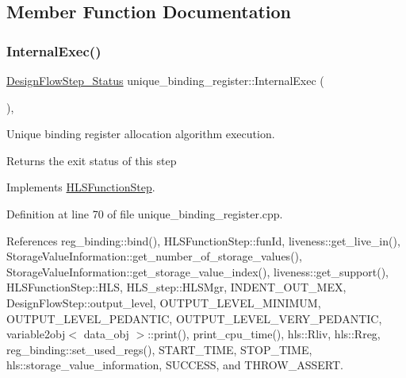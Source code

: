 \subsection{Member Function Documentation}
\mbox{\label{classunique__binding__register_a2ac66d0bc11cd4e54db2042014b52291}} 
\subsubsection{\texorpdfstring{Internal\+Exec()}{InternalExec()}}
{\footnotesize\ttfamily \hyperlink{design__flow__step_8hpp_afb1f0d73069c26076b8d31dbc8ebecdf}{Design\+Flow\+Step\+\_\+\+Status} unique\+\_\+binding\+\_\+register\+::\+Internal\+Exec (\begin{DoxyParamCaption}{ }\end{DoxyParamCaption})\hspace{0.3cm}{\ttfamily [override]}, {\ttfamily [virtual]}}



Unique binding register allocation algorithm execution. 

\begin{DoxyReturn}{Returns}
the exit status of this step 
\end{DoxyReturn}


Implements \hyperlink{classHLSFunctionStep_a8db4c00d080655984d98143206fc9fa8}{H\+L\+S\+Function\+Step}.



Definition at line 70 of file unique\+\_\+binding\+\_\+register.\+cpp.



References reg\+\_\+binding\+::bind(), H\+L\+S\+Function\+Step\+::fun\+Id, liveness\+::get\+\_\+live\+\_\+in(), Storage\+Value\+Information\+::get\+\_\+number\+\_\+of\+\_\+storage\+\_\+values(), Storage\+Value\+Information\+::get\+\_\+storage\+\_\+value\+\_\+index(), liveness\+::get\+\_\+support(), H\+L\+S\+Function\+Step\+::\+H\+LS, H\+L\+S\+\_\+step\+::\+H\+L\+S\+Mgr, I\+N\+D\+E\+N\+T\+\_\+\+O\+U\+T\+\_\+\+M\+EX, Design\+Flow\+Step\+::output\+\_\+level, O\+U\+T\+P\+U\+T\+\_\+\+L\+E\+V\+E\+L\+\_\+\+M\+I\+N\+I\+M\+UM, O\+U\+T\+P\+U\+T\+\_\+\+L\+E\+V\+E\+L\+\_\+\+P\+E\+D\+A\+N\+T\+IC, O\+U\+T\+P\+U\+T\+\_\+\+L\+E\+V\+E\+L\+\_\+\+V\+E\+R\+Y\+\_\+\+P\+E\+D\+A\+N\+T\+IC, variable2obj$<$ data\+\_\+obj $>$\+::print(), print\+\_\+cpu\+\_\+time(), hls\+::\+Rliv, hls\+::\+Rreg, reg\+\_\+binding\+::set\+\_\+used\+\_\+regs(), S\+T\+A\+R\+T\+\_\+\+T\+I\+ME, S\+T\+O\+P\+\_\+\+T\+I\+ME, hls\+::storage\+\_\+value\+\_\+information, S\+U\+C\+C\+E\+SS, and T\+H\+R\+O\+W\+\_\+\+A\+S\+S\+E\+RT.

